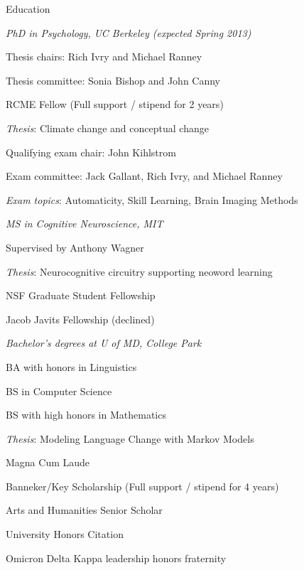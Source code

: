 \begin{rubric}{Education}

\entry*[2007--present] \emph{PhD in Psychology, UC Berkeley (expected Spring
    2013)}
\par Thesis chairs: Rich Ivry and Michael Ranney 
\par Thesis committee: Sonia Bishop and John Canny
\par RCME Fellow (Full support / stipend for 2 years)
\par \emph{Thesis}: Climate change and conceptual change
\par Qualifying exam chair: John Kihlstrom
\par Exam committee: Jack Gallant, Rich Ivry, and Michael Ranney
\par \emph{Exam topics}: Automaticity, Skill Learning, Brain
    Imaging Methods


\entry*[1999--2002] \emph{MS in Cognitive Neuroscience, MIT}
\par Supervised by Anthony Wagner
\par \emph{Thesis}: Neurocognitive circuitry supporting neoword learning
\par NSF Graduate Student Fellowship
\par Jacob Javits Fellowship (declined)




\entry*[1995--1999] \emph{Bachelor's degrees at U of MD, College Park}
\par BA with honors in Linguistics
\par BS in Computer Science
\par BS with high honors in Mathematics
\par \emph{Thesis}: Modeling Language Change with Markov Models
\par Magna Cum Laude
\par Banneker/Key Scholarship (Full support / stipend for 4 years)
\par Arts and Humanities Senior Scholar
\par University Honors Citation
\par Omicron Delta Kappa leadership honors fraternity

 

\end{rubric}
